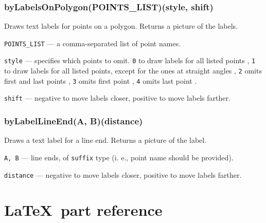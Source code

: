 \documentclass{ltxdoc}
\begin{document}
\subsubsection{byLabelsOnPolygon(POINTS\_LIST)(style, shift)}\label{byLabelsOnPolygon}
	
	Draws text labels for points on a polygon. Returns a picture of the labels.
	
	
	\texttt{POINTS\_LIST} — a comma-separated list of point names.
	
	\texttt{style} — specifies which points to omit. \texttt{0} to draw labels for all listed points
	, \texttt{1} to draw labels for all listed points, except for the ones at straight angles
	, \texttt{2} omits first and last points
	, \texttt{3} omits first point
	, \texttt{4} omits last point
	.
	
	\texttt{shift} — negative to move labels closer, positive to move labels farther.

\subsubsection{byLabelLineEnd(A, B)(distance)}\label{byLabelLineEnd}
	
	Draws a text label for a line end. Returns a picture of the label.
	
	\texttt{A, B} — line ends, of \texttt{suffix} type (i. e., point name should be provided).
	
	\texttt{distance} — negative to move labels closer, positive to move labels farther.


\section{\LaTeX\ part reference}
\end{document}
